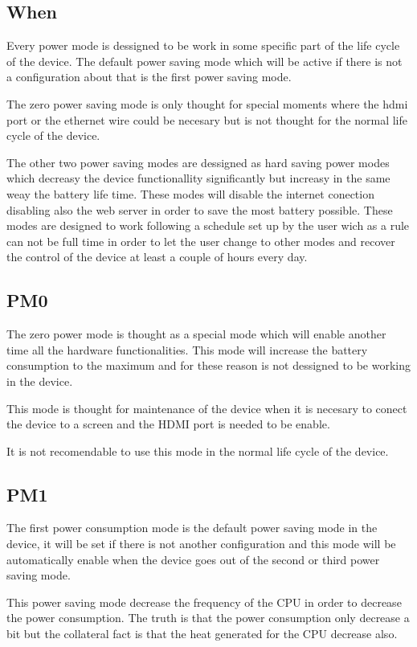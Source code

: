 		\subsection{When}
		Every power mode is dessigned to be work in some specific part of the life cycle of the device. The default power saving mode which will be active if there is not a configuration about that is the first power saving mode. 

		The zero power saving mode is only thought for special moments where the hdmi port or the ethernet wire could be necesary but is not thought for the normal life cycle of the device.

		The other two power saving modes are dessigned as hard saving power modes which decreasy the device functionallity significantly but increasy in the same weay the battery life time. These modes will disable the internet conection disabling also the web server in order to save the most battery possible. These modes are designed to work following a schedule set up by the user wich as a rule can not be full time in order to let the user change to other modes and recover the control of the device at least a couple of hours every day.

		\subsection{PM0}
		The zero power mode is thought as a special mode which will enable another time all the hardware functionalities. This mode will increase the battery consumption to the maximum and for these reason is not dessigned to be working in the device.

		This mode is thought for maintenance of the device when it is necesary to conect the device to a screen and the HDMI port is needed to be enable.

		It is not recomendable to use this mode in the normal life cycle of the device.
		\subsection{PM1}
		The first power consumption mode is the default power saving mode in the device, it will be set if there is not another configuration and this mode will be automatically enable when the device goes out of the second or third power saving mode.

		This power saving mode decrease the frequency of the CPU in order to decrease the power consumption. The truth is that the power consumption only decrease a bit but the collateral fact is that the heat generated for the CPU decrease also.


